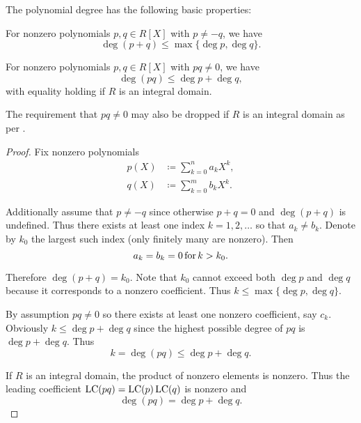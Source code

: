\begin{proposition}\label{thm:polynomial_degree_properties}
  The polynomial degree has the following basic properties:
  \begin{propenum}
     For nonzero polynomials \( p, q \in R[X] \) with \( p \neq -q \), we have
    \begin{equation*}
      \deg (p + q) \leq \max \{ \deg p, \deg q \}.
    \end{equation*}

     For nonzero polynomials \( p, q \in R[X] \) with \( pq \neq 0 \), we have
    \begin{equation*}
      \deg (pq) \leq \deg p + \deg q,
    \end{equation*}
    with equality holding if \( R \) is an integral domain.

    The requirement that \( pq \neq 0 \) may also be dropped if \( R \) is an integral domain as per .
  \end{propenum}
\end{proposition}
\begin{proof}
  Fix nonzero polynomials
  \begin{align}
    p(X) &\coloneqq \sum_{k=0}^n a_k X^k, \label{eq:thm:polynomial_degree_properties/p} \\
    q(X) &\coloneqq \sum_{k=0}^m b_k X^k. \label{eq:thm:polynomial_degree_properties/q}
  \end{align}

   Additionally assume that \( p \neq -q \) since otherwise \( p + q = 0 \) and \( \deg(p + q) \) is undefined. Thus there exists at least one index \( k = 1, 2, \ldots \) so that \( a_k \neq b_k \). Denote by \( k_0 \) the largest such index (only finitely many are nonzero). Then
  \begin{equation*}
    a_k = b_k = 0 \mathop{\text{for}} k > k_0.
  \end{equation*}

  Therefore \( \deg(p + q) = k_0 \). Note that \( k_0 \) cannot exceed both \( \deg p \) and \( \deg q \) because it corresponds to a nonzero coefficient. Thus \( k \leq \max\{ \deg p, \deg q \} \).

   By assumption \( pq \neq 0 \) so there exists at least one nonzero coefficient, say \( c_k \). Obviously \( k \leq \deg p + \deg q \) since the highest possible degree of \( pq \) is \( \deg p + \deg q \). Thus
  \begin{equation*}
    k = \deg (pq) \leq \deg p + \deg q.
  \end{equation*}

  If \( R \) is an integral domain, the product of nonzero elements is nonzero. Thus the leading coefficient \( \operatorname{LC}(pq) = \operatorname{LC}(p)\operatorname{LC}(q) \) is nonzero and
  \begin{equation*}
    \deg(pq) = \deg p + \deg q.
  \end{equation*}
\end{proof}


